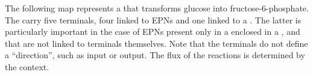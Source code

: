 \begin{center}
\end{center}

The following map represents a  that transforms glucose into fructose-6-phosphate. The  carry five terminals, four linked to EPNs and one linked to a . The latter is particularly important in the case of EPNs present only in a  enclosed in a , and that are not linked to terminals themselves. Note that the terminals do not define a ``direction'', such as input or output. The flux of the reactions is determined by the context.

\begin{center}
\end{center}

